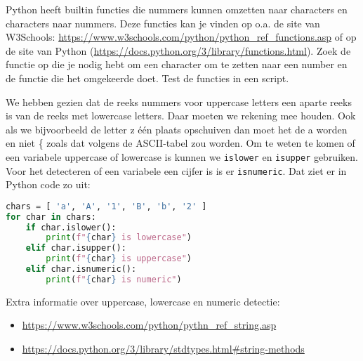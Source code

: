 Python heeft builtin functies die nummers kunnen omzetten naar characters en characters naar nummers. Deze functies kan je vinden op o.a. de site van W3Schools: \url{https://www.w3schools.com/python/python_ref_functions.asp} of op de site van Python (\url{https://docs.python.org/3/library/functions.html}). Zoek de functie op die je nodig hebt om een character om te zetten naar een number en de functie die het omgekeerde doet. Test de functies in een script.

We hebben gezien dat de reeks nummers voor uppercase letters een aparte reeks is van de reeks met lowercase letters. Daar moeten we rekening mee houden. Ook als we bijvoorbeeld de letter z \'e\'en plaats opschuiven dan moet het de a worden en niet \{ zoals dat volgens de ASCII-tabel zou worden. Om te weten te komen of een variabele uppercase of lowercase is kunnen we \texttt{islower} en \texttt{isupper} gebruiken. Voor het detecteren of een variabele een cijfer is is er \texttt{isnumeric}. Dat ziet er in Python code zo uit:
\begin{lstlisting}[language=python]
chars = [ 'a', 'A', '1', 'B', 'b', '2' ]
for char in chars:
    if char.islower():
        print(f"{char} is lowercase")
    elif char.isupper():
        print(f"{char} is uppercase")
    elif char.isnumeric():
        print(f"{char} is numeric")
\end{lstlisting}

Extra informatie over uppercase, lowercase en numeric detectie:
\begin{itemize}
	\item \url{https://www.w3schools.com/python/pythn\_ref\_string.asp}
	\item \url{https://docs.python.org/3/library/stdtypes.html#string-methods}
\end{itemize}

